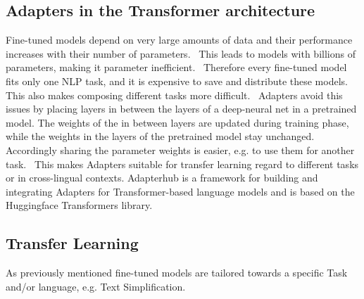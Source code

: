 






\subsection{Adapters in the Transformer architecture}
Fine-tuned models depend on very large amounts of data and their performance increases with their number of parameters.~\cite{Pfeiffer2020}
This leads to models with billions of parameters, making it parameter inefficient.~\cite{Houlsby2019}
Therefore every fine-tuned model fits only one NLP task, and it is expensive to save and distribute these models.
This also makes composing different tasks more difficult.~\cite{Pfeiffer2020}
Adapters avoid this issues by placing layers in between the layers of a deep-neural net in a pretrained model.
The weights of the in between layers are updated during training phase, while the weights in the layers of the pretrained model stay unchanged.
Accordingly sharing the parameter weights is easier, e.g. to use them for another task.~\cite{Houlsby2019}
This makes Adapters suitable for transfer learning regard to different tasks or in cross-lingual contexts.
Adapterhub is a framework for building and integrating Adapters for Transformer-based language models and is based on
the Huggingface Transformers library.~\cite{Pfeiffer2023, Huggingface2023}

\subsection{Transfer Learning}
As previously mentioned fine-tuned models are tailored towards a specific Task and/or language, e.g. Text Simplification. 
